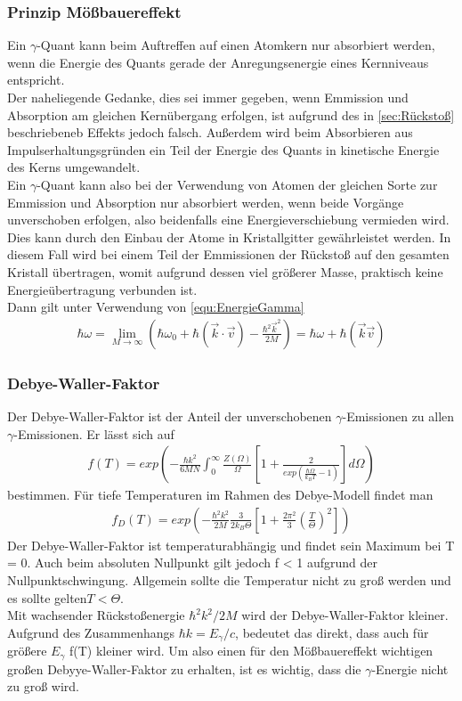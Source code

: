 \documentclass[a4paper,twoside,final]{article}
\begin{document}
\subsubsection{Prinzip Mößbauereffekt}
Ein $\gamma$-Quant kann beim Auftreffen auf einen Atomkern nur absorbiert werden, wenn die Energie des Quants gerade der Anregungsenergie eines Kernniveaus entspricht. \\

Der naheliegende Gedanke, dies sei immer gegeben, wenn Emmission und Absorption am gleichen Kernübergang erfolgen, ist aufgrund des in \ref{sec:Rückstoß} beschriebeneb Effekts jedoch falsch. Außerdem wird beim Absorbieren aus Impulserhaltungsgründen ein Teil der Energie des Quants in kinetische Energie des Kerns umgewandelt. \\

Ein $\gamma$-Quant kann also bei der Verwendung von Atomen der gleichen Sorte zur Emmission und Absorption nur absorbiert werden, wenn beide Vorgänge unverschoben erfolgen, also beidenfalls eine Energieverschiebung vermieden wird. Dies kann durch den Einbau der Atome in Kristallgitter gewährleistet werden. In diesem Fall wird bei einem Teil der Emmissionen der Rückstoß auf den gesamten Kristall übertragen, womit aufgrund dessen viel größerer Masse, praktisch keine Energieübertragung verbunden ist.\\
Dann gilt unter Verwendung von \ref{equ:EnergieGamma}
\begin{align}
\hbar\omega = \lim\limits_{M \to \infty}{(\hbar \omega_0 + \hbar (\vec{k}\cdot\vec{v})-\frac{\hbar^2\vec{k}^2}{2M})} = \hbar\omega+\hbar(\vec{k}\vec{v})
\end{align}

\subsubsection{Debye-Waller-Faktor}
Der Debye-Waller-Faktor ist der Anteil der unverschobenen $\gamma$-Emissionen zu allen $\gamma$-Emissionen. Er lässt sich auf
\begin{align}
f(T) = exp\left(-\frac{\hbar k^2}{6MN}\int_{0}^{\infty} \frac{Z(\Omega)}{\Omega}\left[1+\frac{2}{exp(\frac{\hbar\Omega}{k_B T}-1)}\right] d\Omega\right)
\end{align}
bestimmen. Für tiefe Temperaturen im Rahmen des Debye-Modell findet man
\begin{align}
f_D(T) = exp\left(-\frac{\hbar^2k^2}{2M}\frac{3}{2k_B\Theta}\left[1+\frac{2\pi^2}{3}\left(\frac{T}{\Theta}\right)^2\right]\right)
\end{align}
Der Debye-Waller-Faktor ist temperaturabhängig und findet sein Maximum bei T = 0. Auch beim absoluten Nullpunkt gilt jedoch f < 1 aufgrund der Nullpunktschwingung. Allgemein sollte die Temperatur nicht zu groß werden und es sollte gelten$ T < \Theta$.\\
Mit wachsender Rückstoßenergie $\hbar^2k^2/2M$ wird der Debye-Waller-Faktor kleiner. Aufgrund des Zusammenhangs $\hbar k = E_\gamma / c $, bedeutet das direkt, dass auch für größere $E_\gamma$ f(T) kleiner wird. Um also einen für den Mößbauereffekt wichtigen großen Debyye-Waller-Faktor zu erhalten, ist es wichtig, dass die $\gamma$-Energie nicht zu groß wird.
\end{document}
